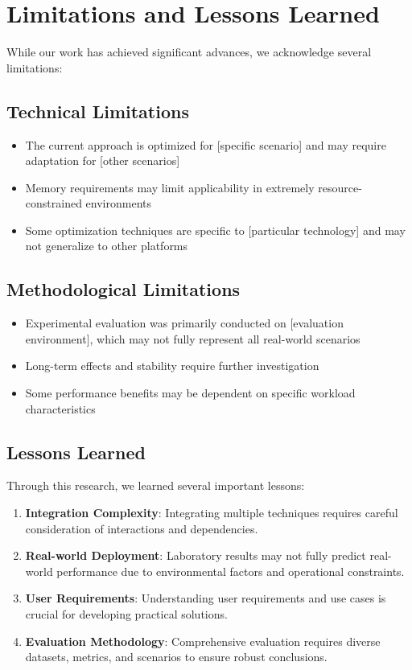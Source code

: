 \section{Limitations and Lessons Learned}

While our work has achieved significant advances, we acknowledge several limitations:

\subsection{Technical Limitations}

\begin{itemize}
    \item The current approach is optimized for [specific scenario] and may require adaptation for [other scenarios]
    \item Memory requirements may limit applicability in extremely resource-constrained environments
    \item Some optimization techniques are specific to [particular technology] and may not generalize to other platforms
\end{itemize}

\subsection{Methodological Limitations}

\begin{itemize}
    \item Experimental evaluation was primarily conducted on [evaluation environment], which may not fully represent all real-world scenarios
    \item Long-term effects and stability require further investigation
    \item Some performance benefits may be dependent on specific workload characteristics
\end{itemize}

\subsection{Lessons Learned}

Through this research, we learned several important lessons:

\begin{enumerate}
    \item \textbf{Integration Complexity}: Integrating multiple techniques requires careful consideration of interactions and dependencies.
    
    \item \textbf{Real-world Deployment}: Laboratory results may not fully predict real-world performance due to environmental factors and operational constraints.
    
    \item \textbf{User Requirements}: Understanding user requirements and use cases is crucial for developing practical solutions.
    
    \item \textbf{Evaluation Methodology}: Comprehensive evaluation requires diverse datasets, metrics, and scenarios to ensure robust conclusions.
\end{enumerate}

